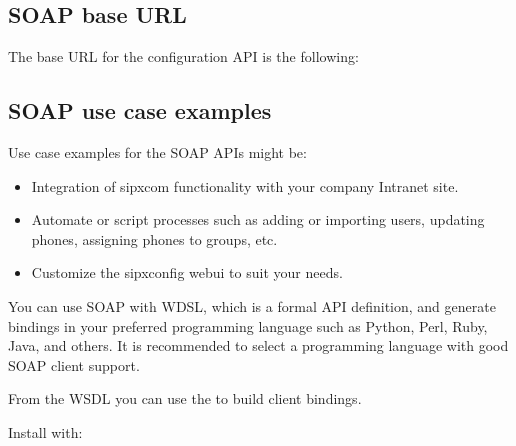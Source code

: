 \documentclass[letterpaper,10pt,english]{sphinxmanual}
\begin{document}
\subsection{SOAP base URL}
\label{\detokenize{soapapi:soap-base-url}}
The base URL for the configuration API is the following:

\begin{sphinxVerbatim}[commandchars=\\\{\}]
\end{sphinxVerbatim}


\subsection{SOAP use case examples}
\label{\detokenize{soapapi:soap-use-case-examples}}
Use case examples for the SOAP APIs might be:
\begin{itemize}
\item {} 
Integration of sipxcom functionality with your company Intranet site.

\item {} 
Automate or script processes such as adding or importing users, updating phones, assigning phones to groups, etc.

\item {} 
Customize the sipxconfig webui to suit your needs.

\end{itemize}

You can use SOAP with WDSL, which is a formal API definition, and generate bindings in your preferred programming language such as Python, Perl, Ruby, Java, and others. It is recommended to select a programming language with good SOAP client support.

 From the WSDL you can use the  to build client bindings.

 Install  with:

\begin{sphinxVerbatim}[commandchars=\\\{\}]
   
\end{sphinxVerbatim}
\end{document}
